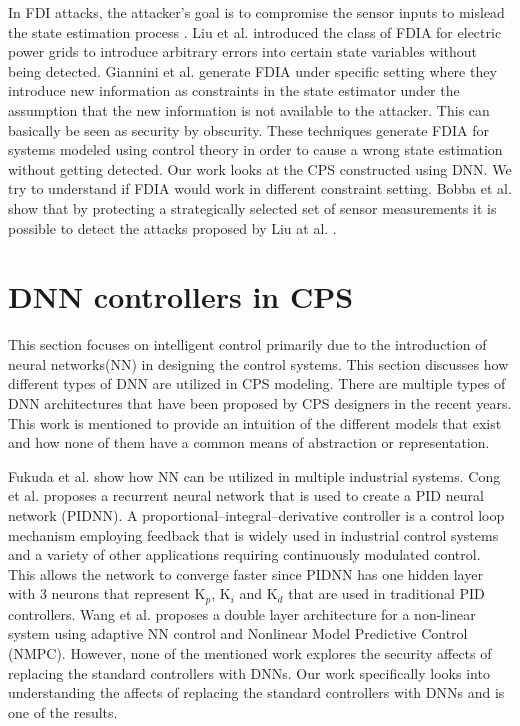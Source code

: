 In FDI attacks, the attacker's goal is to compromise the sensor inputs to mislead the state estimation process \cite{e3f0020abba24d4389aff937fe8bcdd5}. Liu et al. \cite{10.1145/1952982.1952995} introduced the class of FDIA for electric power grids to introduce arbitrary errors into certain state variables without being detected. Giannini et al. \cite{unknown} generate FDIA under specific setting %
where they introduce new information as constraints in the state estimator under the assumption that the new information is not available to the attacker. This can basically be seen as security by obscurity. These techniques generate FDIA for systems modeled using control theory in order to cause a wrong state estimation without getting detected. Our work looks at the CPS constructed using \ac{DNN}. We try to understand if \ac{FDIA} would work in different constraint setting. Bobba et al. \cite{Bobba2010DetectingFD} show that by protecting a strategically selected set of sensor measurements it is possible to detect the attacks proposed by Liu at al. \cite{10.1145/1952982.1952995}.

\section{DNN controllers in CPS}
This section focuses on intelligent control primarily due to the introduction of neural networks(NN) in designing the control systems. This section discusses how different types of \ac{DNN} are utilized in \ac{CPS} modeling. There are multiple types of \ac{DNN} architectures that have been proposed by \ac{CPS} designers in the recent years. This work is mentioned to provide an intuition of the different models that exist and how none of them have a common means of abstraction or representation.   %


Fukuda et al. \cite{170966} show how NN can be utilized in multiple industrial systems. Cong et al. \cite{Cong} proposes a recurrent neural network that is used to create a PID neural network (PIDNN). A proportional–integral–derivative controller is a control loop mechanism employing feedback that is widely used in industrial control systems and a variety of other applications requiring continuously modulated control. This allows the network to converge faster since PIDNN has one hidden layer with 3 neurons that represent K$_p$, K$_i$ and K$_d$ that are used in traditional PID controllers. Wang et al. \cite{Wang2016ACA} proposes a double layer architecture for a non-linear system using adaptive NN control and Nonlinear Model Predictive Control (NMPC). However, none of the mentioned work explores the security affects of replacing the standard controllers with DNNs. Our work specifically looks into understanding the affects of replacing the standard controllers with DNNs and \attack is one of the results.

